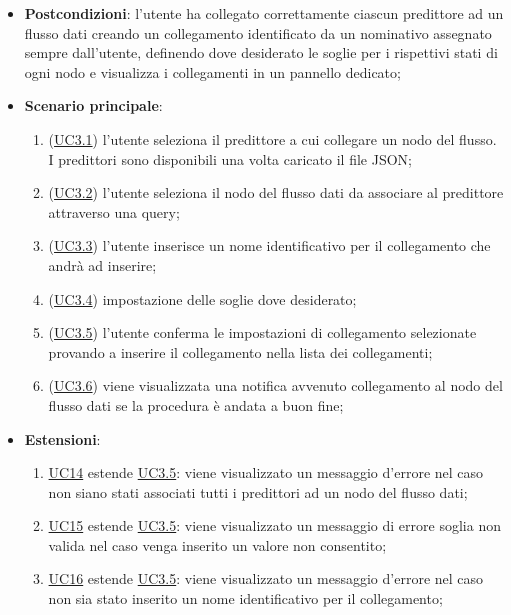 \begin{itemize}
\begin{enumerate}
					
				\end{enumerate}
			\item\textbf{Postcondizioni}: l'utente ha collegato correttamente ciascun predittore ad un flusso dati creando un collegamento identificato da un nominativo assegnato sempre dall'utente, definendo dove desiderato le soglie per i rispettivi stati di ogni nodo e visualizza i collegamenti in un pannello dedicato;
			\item\textbf{Scenario principale}:
				\begin{enumerate}
					\item (\hyperref[par:UC3.1]{UC3.1}) l'utente seleziona il predittore a cui collegare un nodo del flusso. I predittori sono disponibili una volta caricato il file JSON;
					\item (\hyperref[par:UC3.2]{UC3.2}) l'utente seleziona il nodo del flusso dati da associare al predittore attraverso una query\glo;
					\item (\hyperref[par:UC3.3]{UC3.3}) l'utente inserisce un nome identificativo per il collegamento che andrà ad inserire;
					\item (\hyperref[par:UC3.4]{UC3.4}) impostazione delle soglie dove desiderato;
					\item (\hyperref[par:UC3.5]{UC3.5}) l'utente conferma le impostazioni di collegamento selezionate provando a inserire il collegamento nella lista dei collegamenti;	
					\item (\hyperref[par:UC3.6]{UC3.6}) viene visualizzata una notifica avvenuto collegamento al nodo del flusso dati se la procedura è andata a buon fine;
				\end{enumerate}
			\item\textbf{Estensioni}:
				\begin{enumerate}
				\item\hyperref[par:UC14]{UC14} estende \hyperref[par:UC3.5]{UC3.5}: viene visualizzato un messaggio d'errore nel caso non siano stati associati tutti i predittori ad un nodo del flusso dati;
					\item\hyperref[par:UC15]{UC15} estende \hyperref[par:UC3.5]{UC3.5}: viene visualizzato un messaggio di errore soglia non valida nel caso venga inserito un valore non consentito;
					\item\hyperref[par:UC16]{UC16} estende \hyperref[par:UC3.5]{UC3.5}: viene visualizzato un messaggio d'errore nel caso non sia stato inserito un nome identificativo per il collegamento;
					
						
				\end{enumerate}
		\end{itemize}
		

